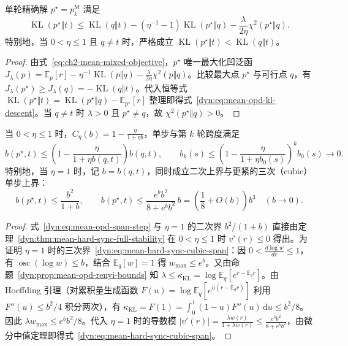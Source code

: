 \documentclass[lang=cn,scheme=chinese,openany]{elegantbook}
\newcommand{\E}{\mathbb E}
\newcommand{\KL}{\operatorname{KL}}
\begin{document}
\begin{proposition}
\label{dyn:prop:mean-opd-kl-descent}
单轮精确解 $p^\star=p_k^{\mathrm M}$ 满足
\begin{equation}
 \KL(p^\star\Vert t)
 \le\KL(q\Vert t)-\left(\eta^{-1}-1\right)\KL(p^\star\Vert q)
       -\frac{\lambda}{2\eta}\chi^2(p^\star\Vert q).
 \label{dyn:eq:mean-opd-kl-descent}
\end{equation}
特别地，当 $0<\eta\le1$ 且 $q\ne t$ 时，严格成立 $\KL(p^\star\Vert t)<\KL(q\Vert t)$。
\end{proposition}
\begin{proof}
由式~\eqref{eq:ch2-mean-mixed-objective}，$p^\star$ 唯一最大化凹泛函 $J_\lambda(p)=\E_p[r]-\eta^{-1}\KL(p\Vert q)-\frac{\lambda}{2\eta}\chi^2(p\Vert q)$。比较最大点 $p^\star$ 与可行点 $q$，有 $J_\lambda(p^\star)\ge J_\lambda(q)=-\KL(q\Vert t)$。代入恒等式 $\KL(p^\star\Vert t)=\KL(p^\star\Vert q)-\E_{p^\star}[r]$ 整理即得式~\eqref{dyn:eq:mean-opd-kl-descent}。当 $q\ne t$ 时 $\lambda>0$ 且 $p^\star\ne q$，故 $\chi^2(p^\star\Vert q)>0$。
\end{proof}

\begin{theorem}[$0<\eta\le 1$ 的跨度几何率与 $\eta=1$ 的二次/三次单步跨度上界]
\label{dyn:thm:mean-opd-span-convergence}
\label{dyn:prop:mean-hard-sync-cubic-span}
当 $0<\eta\le 1$ 时，$C_\eta(b)=1-\frac{\eta}{1+\eta b}$，单步与第 $k$ 轮跨度满足
\begin{equation}
 b(p^\star,t)\le\left(1-\frac{\eta}{1+\eta b(q,t)}\right)b(q,t),\qquad
 b_k(s)\le\left(1-\frac{\eta}{1+\eta b_0(s)}\right)^k b_0(s)\longrightarrow 0.
 \label{dyn:eq:mean-opd-span-step,dyn:eq:mean-opd-span-geometric}
\end{equation}
特别地，当 $\eta=1$ 时，记 $b=b(q,t)$，同时成立二次上界与更紧的三次（cubic）单步上界：
\begin{equation}
 b(p^\star,t)\le\frac{b^2}{1+b},\qquad
 b(p^\star,t)\le\frac{e^b b^2}{8+e^b b^2}\,b=\left(\frac18+O(b)\right)b^3\quad(b\to 0).
 \label{dyn:eq:mean-opd-span-quadratic,dyn:eq:mean-hard-sync-cubic-span}
\end{equation}
\end{theorem}
\begin{proof}
式~\eqref{dyn:eq:mean-opd-span-step} 与 $\eta=1$ 的二次界 $b^2/(1+b)$ 直接由定理~\ref{dyn:thm:mean-hard-sync-full-stability} 在 $0<\eta\le 1$ 时 $v'(r)\le 0$ 得出。为证明 $\eta=1$ 时的三次界~\eqref{dyn:eq:mean-hard-sync-cubic-span}：因 $0<\frac{d\log w}{dr}\le 1$，有 $\operatorname{osc}(\log w)\le b$，结合 $\E_q[w]=1$ 得 $w_{\max}\le e^b$。又由命题~\ref{dyn:prop:mean-opd-renyi-bounds} 知 $\lambda\le\kappa_{\mathrm{KL}}=\log\E_q[e^{r-\E_q r}]$。由 Hoeffding 引理（对累积量生成函数 $F(u)=\log\E_q[e^{u(r-\E_q r)}]$ 利用 $F''(u)\le b^2/4$ 积分两次），有 $\kappa_{\mathrm{KL}}=F(1)=\int_0^1(1-u)F''(u)\,\mathrm du\le b^2/8$。因此 $\lambda w_{\max}\le e^b b^2/8$。代入 $\eta=1$ 时的导数模 $|v'(r)|=\frac{\lambda w(r)}{1+\lambda w(r)}\le\frac{e^b b^2}{8+e^b b^2}$，由微分中值定理即得式~\eqref{dyn:eq:mean-hard-sync-cubic-span}。
\end{proof}
\end{document}
